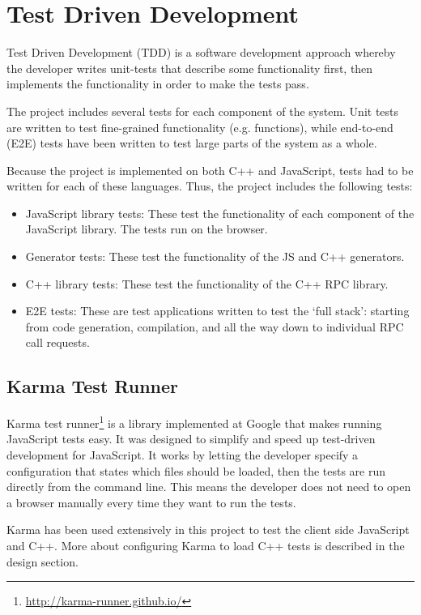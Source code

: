 \section{Test Driven Development} %
\label{sec:test_driven_development}
Test Driven Development (TDD) is a software development approach whereby the developer writes unit-tests that describe some functionality first, then implements the functionality in order to make the tests pass.

The project includes several tests for each component of the system. Unit tests are written to test fine-grained functionality (e.g. functions), while end-to-end (E2E) tests have been written to test large parts of the system as a whole.

Because the project is implemented on both C++ and JavaScript, tests had to be written for each of these languages. Thus, the project includes the following tests:

\begin{itemize}
	\item JavaScript library tests: These test the functionality of each component of the JavaScript library. The tests run on the browser.
	\item Generator tests: These test the functionality of the JS and C++ generators.
	\item C++ library tests: These test the functionality of the C++ RPC library.
	\item E2E tests: These are test applications written to test the `full stack': starting from code generation, compilation, and all the way down to individual RPC call requests.
\end{itemize}

\subsection{Karma Test Runner} %
\label{sub:karma_test_runner}
Karma test runner\footnote{\url{http://karma-runner.github.io/}} is a library implemented at Google that makes running JavaScript tests easy. It was designed to simplify and speed up test-driven development for JavaScript. It works by letting the developer specify a configuration that states which files should be loaded, then the tests are run directly from the command line. This means the developer does not need to open a browser manually every time they want to run the tests.

Karma has been used extensively in this project to test the client side JavaScript and C++. More about configuring Karma to load C++ tests is described in the design section.

